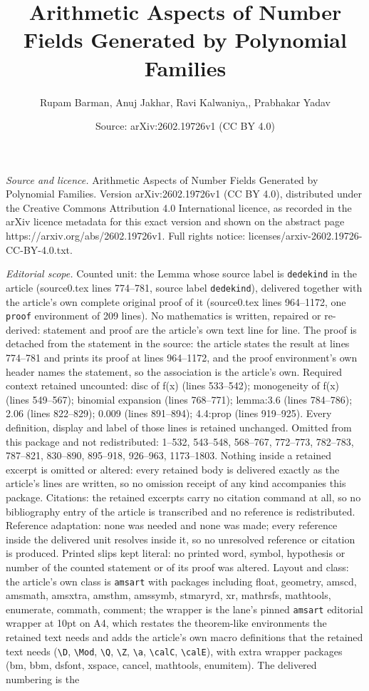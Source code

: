 \documentclass[10pt,a4paper]{amsart}
\title[Arithmetic Aspects of Number Fields Generated by Polynomial ]{Arithmetic Aspects of Number Fields Generated by Polynomial Families}
\author{Rupam Barman, Anuj Jakhar, Ravi Kalwaniya,, Prabhakar Yadav}
\date{Source: arXiv:2602.19726v1 (CC BY 4.0)}
\begin{document}
\maketitle

\noindent\emph{Source and licence.} Arithmetic Aspects of Number Fields Generated by Polynomial Families. Version arXiv:2602.19726v1 (CC BY 4.0), distributed under the Creative Commons Attribution 4.0 International licence, as recorded in the arXiv licence metadata for this exact version and shown on the abstract page https://arxiv.org/abs/2602.19726v1. Full rights notice: licenses/arxiv-2602.19726-CC-BY-4.0.txt.\par\smallskip

\noindent\textit{Editorial scope.} Counted unit: the Lemma whose source label is \texttt{dedekind} in the article (source0.tex lines 774--781, source label \texttt{dedekind}), delivered together with the article's own complete original proof of it (source0.tex lines 964--1172, one \texttt{proof} environment of 209 lines). No mathematics is written, repaired or re-derived: statement and proof are the article's own text line for line. The proof is detached from the statement in the source: the article states the result at lines 774--781 and prints its proof at lines 964--1172, and the proof environment's own header names the statement, so the association is the article's own. Required context retained uncounted: disc of f(x) (lines 533--542); monogeneity of f(x) (lines 549--567); binomial expansion (lines 768--771); lemma:3.6 (lines 784--786); 2.06 (lines 822--829); 0.009 (lines 891--894); 4.4:prop (lines 919--925). Every definition, display and label of those lines is retained unchanged. Omitted from this package and not redistributed: 1--532, 543--548, 568--767, 772--773, 782--783, 787--821, 830--890, 895--918, 926--963, 1173--1803. Nothing inside a retained excerpt is omitted or altered: every retained body is delivered exactly as the article's lines are written, so no omission receipt of any kind accompanies this package. Citations: the retained excerpts carry no citation command at all, so no bibliography entry of the article is transcribed and no reference is redistributed. Reference adaptation: none was needed and none was made; every reference inside the delivered unit resolves inside it, so no unresolved reference or citation is produced. Printed slips kept literal: no printed word, symbol, hypothesis or number of the counted statement or of its proof was altered. Layout and class: the article's own class is \texttt{amsart} with packages including float, geometry, amscd, amsmath, amsxtra, amsthm, amssymb, stmaryrd, xr, mathrsfs, mathtools, enumerate, commath, comment; the wrapper is the lane's pinned \texttt{amsart} editorial wrapper at 10pt on A4, which restates the theorem-like environments the retained text needs and adds the article's own macro definitions that the retained text needs (\texttt{\textbackslash D}, \texttt{\textbackslash Mod}, \texttt{\textbackslash Q}, \texttt{\textbackslash Z}, \texttt{\textbackslash a}, \texttt{\textbackslash calC}, \texttt{\textbackslash calE}), with extra wrapper packages (bm, bbm, dsfont, xspace, cancel, mathtools, enumitem). The delivered numbering is the 
\end{document}
